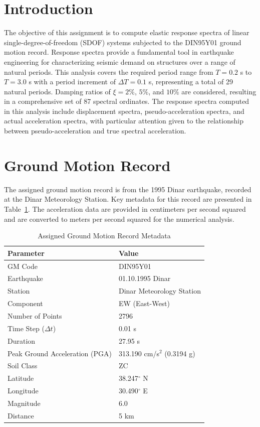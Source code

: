 ﻿\documentclass[12pt]{article}
\begin{document}
\newpage

\section{Introduction}

The objective of this assignment is to compute elastic response spectra of linear single-degree-of-freedom (SDOF) systems subjected to the DIN95Y01 ground motion record. Response spectra provide a fundamental tool in earthquake engineering for characterizing seismic demand on structures over a range of natural periods. This analysis covers the required period range from \(T = 0.2\) s to \(T = 3.0\) s with a period increment of \(\Delta T = 0.1\) s, representing a total of 29 natural periods. Damping ratios of \(\xi = 2\%\), \(5\%\), and \(10\%\) are considered, resulting in a comprehensive set of 87 spectral ordinates. The response spectra computed in this analysis include displacement spectra, pseudo-acceleration spectra, and actual acceleration spectra, with particular attention given to the relationship between pseudo-acceleration and true spectral acceleration.

\section{Ground Motion Record}

The assigned ground motion record is from the 1995 Dinar earthquake, recorded at the Dinar Meteorology Station. Key metadata for this record are presented in Table~\ref{tab:gm_metadata}. The acceleration data are provided in centimeters per second squared and are converted to meters per second squared for the numerical analysis.

\begin{table}[H]
\centering
\caption{Assigned Ground Motion Record Metadata}
\label{tab:gm_metadata}
\begin{tabular}{ll}
\toprule
\textbf{Parameter} & \textbf{Value} \\
\midrule
GM Code & DIN95Y01 \\
Earthquake & 01.10.1995 Dinar \\
Station & Dinar Meteorology Station \\
Component & EW (East-West) \\
Number of Points & 2796 \\
Time Step (\(\Delta t\)) & 0.01 s \\
Duration & 27.95 s \\
Peak Ground Acceleration (PGA) & 313.190 cm/s\(^2\) (0.3194 g) \\
Soil Class & ZC \\
Latitude & 38.247$^{\circ}$ N \\
Longitude & 30.490$^{\circ}$ E \\
Magnitude & 6.0 \\
Distance & 5 km \\
\bottomrule
\end{tabular}
\end{table}
\end{document}
